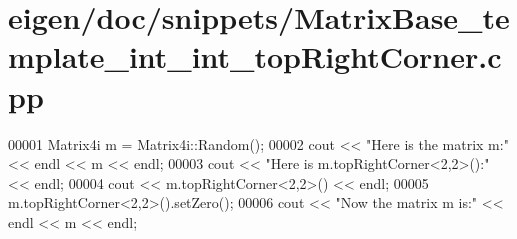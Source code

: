 \hypertarget{eigen_2doc_2snippets_2_matrix_base__template__int__int__top_right_corner_8cpp_source}{}\section{eigen/doc/snippets/\+Matrix\+Base\+\_\+template\+\_\+int\+\_\+int\+\_\+top\+Right\+Corner.cpp}
\label{eigen_2doc_2snippets_2_matrix_base__template__int__int__top_right_corner_8cpp_source}

\begin{DoxyCode}
00001 Matrix4i m = Matrix4i::Random();
00002 cout << \textcolor{stringliteral}{"Here is the matrix m:"} << endl << m << endl;
00003 cout << \textcolor{stringliteral}{"Here is m.topRightCorner<2,2>():"} << endl;
00004 cout << m.topRightCorner<2,2>() << endl;
00005 m.topRightCorner<2,2>().setZero();
00006 cout << \textcolor{stringliteral}{"Now the matrix m is:"} << endl << m << endl;
\end{DoxyCode}

